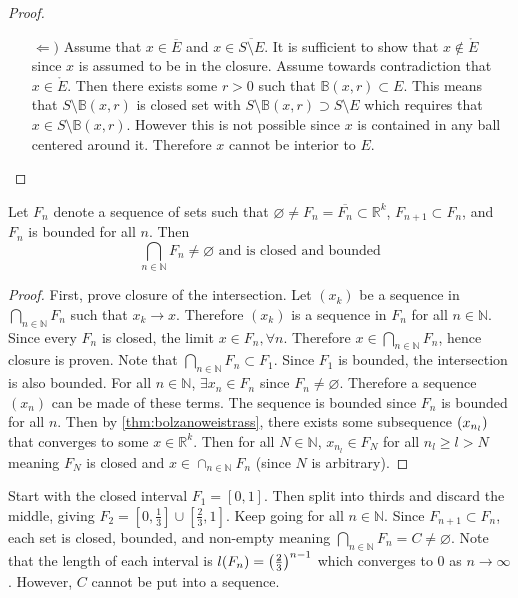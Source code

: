 \documentclass[../notes.tex]{subfiles}
\begin{document}
\begin{proof}
\begin{enumerate}
\begin{enumerate}
            \item[$\Leftarrow)$] %
                Assume that $x \in \overline{E}$ and $x \in \overline{S \setminus E}$. It is sufficient to show that $x \notin \mathring{E}$ since $x$ is assumed to be in the closure. Assume towards contradiction that $x \in \mathring{E}$. Then there exists some $r > 0$ such that $\mathbb{B}(x,r) \subset E$. This means that $S \setminus \mathbb{B}(x,r)$ is closed set with $S \setminus \mathbb{B}(x,r) \supset S \setminus E$ which requires that $x \in S \setminus \mathbb{B}(x,r)$. However this is not possible since $x$ is contained in any ball centered around it. Therefore $x$ cannot be interior to $E$.
        \end{enumerate}
    \end{enumerate}
\end{proof}


\begin{theorem}
    \label{thm:setsequencebounded}
    Let $F_n$ denote a sequence of sets such that $\varnothing \neq F_n = \overline{F_n} \subset \mathbb{R}^k$, $F_{n+1} \subset F_{n}$, and $F_n$ is bounded for all $n$. Then
    \[
        \bigcap_{n\in \mathbb{N}} F_n \neq \varnothing \text{ and is closed and bounded}
    \]
\end{theorem}
\begin{proof}
    First, prove closure of the intersection. Let $(x_k)$ be a sequence in $\bigcap_{n\in \mathbb{N}} F_n$ such that $x_k \to x$. Therefore $(x_k)$ is a sequence in $F_n$ for all $n \in \mathbb{N}$. Since every $F_n$ is closed, the limit $x \in F_n, \forall n$. Therefore $x \in \bigcap_{n\in \mathbb{N}} F_n$, hence closure is proven. Note that $\bigcap_{n \in \mathbb{N}} F_n \subset F_1$. Since $F_1$ is bounded, the intersection is also bounded. For all $n \in \mathbb{N}$, $\exists x_n \in F_n$ since $F_n \neq \varnothing$. Therefore a sequence $(x_n)$ can be made of these terms. The sequence is bounded since $F_n$ is bounded for all $n$. Then by \ref{thm:bolzanoweistrass}, there exists some subsequence $\qty(x_{n_l})$ that converges to some $x \in \mathbb{R}^k$. Then for all $N \in \mathbb{N}$, $x_{n_l} \in F_N$ for all $n_l \geq l > N$ meaning $F_N$ is closed and $x \in \cap_{n\in \mathbb{N}} F_n$ (since $N$ is arbitrary).
\end{proof}

\begin{example}
    Start with the closed interval $F_1 = [0,1]$. Then split into thirds and discard the middle, giving $F_2 = [0,\frac{1}{3}] \cup [\frac{2}{3}, 1]$. Keep going for all $n \in \mathbb{N}$. Since $F_{n+1} \subset F_n$, each set is closed, bounded, and non-empty meaning $\bigcap_{n\in \mathbb{N}} F_n = C \neq \varnothing$. Note that the length of each interval is $l(F_n) = \qty(\frac{2}{3})^{n-1}$ which converges to $0$ as $n \to \infty$. However, $C$ cannot be put into a sequence.
\end{example}
\end{document}
